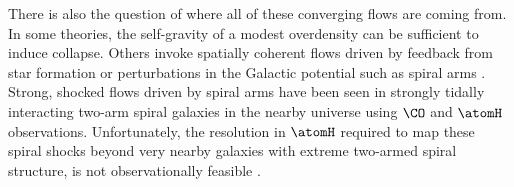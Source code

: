 
There is also the question of where all of these converging flows are coming from. 
In some theories, the self-gravity of a modest overdensity can be sufficient \citep{Kim:2002da,VazquezSemadeni:2007cj,2012MNRAS.425.2157D} to induce collapse. 
Others invoke spatially coherent flows driven by feedback from star formation or perturbations in the Galactic potential such as spiral arms \citep{Roberts:1972bp,Bonnell:2006hn,Fujimoto:2014kh}.
Strong, shocked flows driven by spiral arms have been seen in strongly tidally interacting two-arm spiral galaxies in the nearby universe \citep{Visser:1980vc,Visser:1980ud,Shetty_2007} using $\CO$ and $\atomH$ observations.
Unfortunately, the resolution in $\atomH$ required to map these spiral shocks beyond very nearby galaxies with extreme two-armed spiral structure, is not observationally feasible \cite{Visser:1980ud}.


